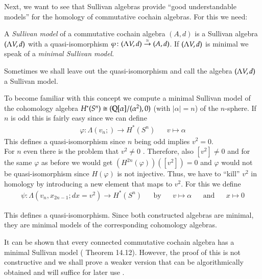 Next, we want to see that Sullivan algebras provide ``good understandable models'' for the homology of 
commutative cochain algebras. For this we need:

\begin{Definition}
  A \emph{Sullivan model} of a commutative cochain algebra $(A,d)$ is a Sullivan algebra $(\Lambda V,d)$ with a quasi-isomorphism
  $\varphi \colon (\Lambda V,d) \overset{\simeq}{\to} (A,d)$. If $(\Lambda V,d)$ is minimal we speak of a 
  \emph{minimal Sullivan model}.
\end{Definition}
Sometimes we shall leave out the quasi-isomorphism and call the algebra $(\Lambda V,d)$ a Sullivan model.

\begin{Example}
\label{ex:MinimalModelOfSpheres}
 To become familiar with this concept we compute a minimal Sullivan model of the cohomology 
 algebra $H^*(S^n) \cong (\mathbb{Q} [\alpha] / (\alpha^2), 0)$ (with $|\alpha| = n$) of the
 $n$-sphere. If $n$ is odd this is fairly easy since we can define 
 \begin{align*}
  \varphi \colon \Lambda (v_n;) \to H^*(S^n) & & v \mapsto \alpha
 \end{align*}
 This defines a quasi-isomorphism since $n$ being odd implies
 $ v^2 = 0$. \\
 For $n$ even there is the problem that $v^2 \neq 0$ . Therefore, also 
 $[v^2] \neq 0$ and for the same $\varphi$ as before we would get
 $(H^{2n}(\varphi)) ([v^2]) = 0$ and $\varphi$ would not be quasi-isomorphism since $H(\varphi)$ is not injective.
 Thus, we have to ``kill'' $v^2$
 in homology by introducing a new element that maps to $v^2$. For this we define
  \begin{align*}
  \psi \colon \Lambda(v_n, x_{2n -1}; dx = v^2) \to H^*(S^n)& & \text{by}  &&v \mapsto \alpha& &\text{and}& & x \mapsto 0 
 \end{align*}
 
 This defines a quasi-isomorphism. Since both constructed algebras are minimal, they are minimal models
 of the corresponding cohomology algebras.
\end{Example}

\begin{Remark}
\label{rem:MinimalSullivanModelsExist}
It can be shown that every connected commutative cochain algebra has a minimal Sullivan model
(\cite{Felix2001} Theorem 14.12). However, the proof of this is not constructive and we shall prove a weaker 
version that can be algorithmically obtained and will suffice for later use .
\end{Remark}

